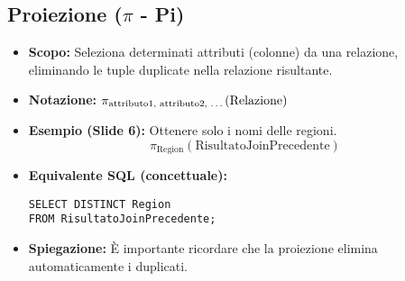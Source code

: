 \subsection{\texorpdfstring{Proiezione ($\pi$ - Pi)}{Proiezione (pi - Pi)}}
\begin{itemize}
    \item \textbf{Scopo:} Seleziona determinati attributi (colonne) da una relazione, eliminando le tuple duplicate nella relazione risultante.
    \item \textbf{Notazione:} $\pi_{\text{attributo1, attributo2, \dots}}(\text{Relazione})$
    \item \textbf{Esempio (Slide 6):} Ottenere solo i nomi delle regioni.
          \[ \pi_{\text{Region}}(\text{RisultatoJoinPrecedente}) \]
    \item \textbf{Equivalente SQL (concettuale):}
\begin{verbatim}
SELECT DISTINCT Region
FROM RisultatoJoinPrecedente;
\end{verbatim}
    \item \textbf{Spiegazione:} È importante ricordare che la proiezione elimina automaticamente i duplicati.
\end{itemize}

